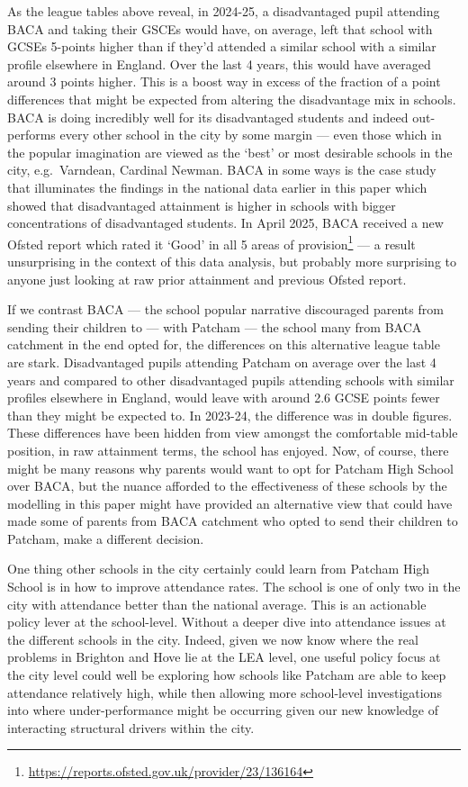 \documentclass[
  11pt,
]{article}
\begin{document}
As the league tables above reveal, in 2024-25, a disadvantaged pupil
attending BACA and taking their GSCEs would have, on average, left that
school with GCSEs 5-points higher than if they'd attended a similar
school with a similar profile elsewhere in England. Over the last 4
years, this would have averaged around 3 points higher. This is a boost
way in excess of the fraction of a point differences that might be
expected from altering the disadvantage mix in schools. BACA is doing
incredibly well for its disadvantaged students and indeed out-performs
every other school in the city by some margin --- even those which in
the popular imagination are viewed as the `best' or most desirable
schools in the city, e.g.~Varndean, Cardinal Newman. BACA in some ways
is the case study that illuminates the findings in the national data
earlier in this paper which showed that disadvantaged attainment is
higher in schools with bigger concentrations of disadvantaged students.
In April 2025, BACA received a new Ofsted report which rated it `Good'
in all 5 areas of provision\footnote{\url{https://reports.ofsted.gov.uk/provider/23/136164}}
--- a result unsurprising in the context of this data analysis, but
probably more surprising to anyone just looking at raw prior attainment
and previous Ofsted report.

If we contrast BACA --- the school popular narrative discouraged parents
from sending their children to --- with Patcham --- the school many from
BACA catchment in the end opted for, the differences on this alternative
league table are stark. Disadvantaged pupils attending Patcham on
average over the last 4 years and compared to other disadvantaged pupils
attending schools with similar profiles elsewhere in England, would
leave with around 2.6 GCSE points fewer than they might be expected to.
In 2023-24, the difference was in double figures. These differences have
been hidden from view amongst the comfortable mid-table position, in raw
attainment terms, the school has enjoyed. Now, of course, there might be
many reasons why parents would want to opt for Patcham High School over
BACA, but the nuance afforded to the effectiveness of these schools by
the modelling in this paper might have provided an alternative view that
could have made some of parents from BACA catchment who opted to send
their children to Patcham, make a different decision.

One thing other schools in the city certainly could learn from Patcham
High School is in how to improve attendance rates. The school is one of
only two in the city with attendance better than the national average.
This is an actionable policy lever at the school-level. Without a deeper
dive into attendance issues at the different schools in the city.
Indeed, given we now know where the real problems in Brighton and Hove
lie at the LEA level, one useful policy focus at the city level could
well be exploring how schools like Patcham are able to keep attendance
relatively high, while then allowing more school-level investigations
into where under-performance might be occurring given our new knowledge
of interacting structural drivers within the city.
\end{document}
